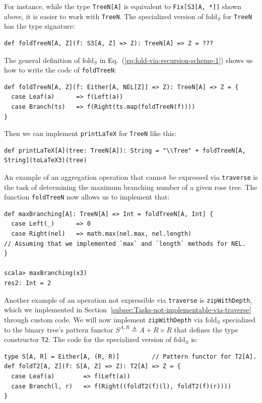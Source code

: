 For instance, while the type \lstinline!TreeN[A]! is equivalent to
\lstinline!Fix[S3[A, *]]! shown above, it is easier to work with
\lstinline!TreeN!. The specialized version of $\text{fold}_{S}$
for \lstinline!TreeN! has the type signature:
\begin{lstlisting}
def foldTreeN[A, Z](f: S3[A, Z] => Z): TreeN[A] => Z = ???
\end{lstlisting}
The general definition of $\text{fold}_{S}$ in Eq.~(\ref{eq:fold-via-recursion-scheme-1})
shows us how to write the code of \lstinline!foldTreeN!: 
\begin{lstlisting}
def foldTreeN[A, Z](f: Either[A, NEL[Z]] => Z): TreeN[A] => Z = {
  case Leaf(a)      => f(Left(a))
  case Branch(ts)   => f(Right(ts.map(foldTreeN(f))))
}
\end{lstlisting}
Then we can implement \lstinline!printLaTeX! for \lstinline!TreeN!
like this:
\begin{lstlisting}
def printLaTeX[A](tree: TreeN[A]): String = "\\Tree" + foldTreeN[A, String](toLaTeX3)(tree)
\end{lstlisting}

An example of an aggregation operation that cannot be expressed via
\lstinline!traverse! is the task of determining the maximum branching
number of a given rose tree. The function \lstinline!foldTreeN! now
allows us to implement that:
\begin{lstlisting}
def maxBranching[A]: TreeN[A] => Int = foldTreeN[A, Int] {
  case Left(_)      => 0
  case Right(nel)   => math.max(nel.max, nel.length)
// Assuming that we implemented `max` and `length` methods for NEL.
}

scala> maxBranching(x3)
res2: Int = 2
\end{lstlisting}

Another example of an operation not expressible via \lstinline!traverse!
is \lstinline!zipWithDepth!, which we implemented in Section~\ref{subsec:Tasks-not-implementable-via-traverse}
through custom code. We will now implement \lstinline!zipWithDepth!
via $\text{fold}_{S}$ specialized to the binary tree\textsf{'}s pattern functor
$S^{A,R}\triangleq A+R\times R$ that defines the  type constructor
\lstinline!T2!. The code for the specialized version of $\text{fold}_{S}$
is:
\begin{lstlisting}
type S[A, R] = Either[A, (R, R)]         // Pattern functor for T2[A].
def foldT2[A, Z](f: S[A, Z] => Z): T2[A] => Z = {
  case Leaf(a)        => f(Left(a))
  case Branch(l, r)   => f(Right((foldT2(f)(l), foldT2(f)(r))))
}
\end{lstlisting}

